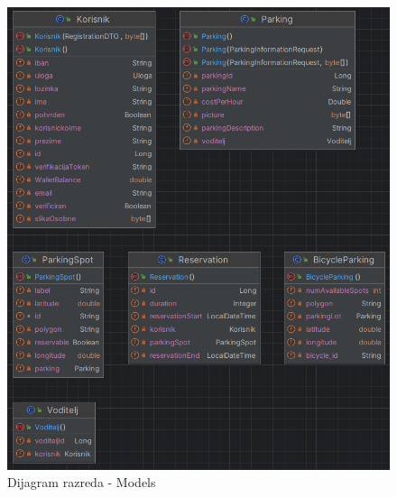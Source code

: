 \begin{figure}[H]
	\includegraphics[width=\textwidth]{slike/models.png} %
	\centering
	\caption{Dijagram razreda - Models}
	\label{fig:dijagramrazreda2}
\end{figure}

